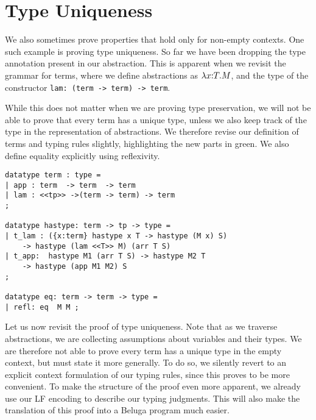 \section{Type Uniqueness}\label{chap:proofs-open-derivations}
We also sometimes prove properties that hold only for non-empty
contexts. One such example is proving type uniqueness. So far we have
been dropping the type annotation present in our abstraction. This is
apparent when we revisit the grammar for terms, where we define
abstractions as $\lambda x{:}T.M$, and the type of the constructor
\lstinline!lam: (term -> term) -> term!.

While this does not matter when we are proving type preservation, we
will not be able to prove that every term has a unique type, unless we
also keep track of the type in the representation of abstractions. We
therefore revise our definition of terms and typing rules slightly,
highlighting the new parts in green. We also define equality
explicitly using reflexivity.

\begin{lstlisting}
datatype term : type =
| app : term  -> term  -> term
| lam : <<tp>> ->(term -> term) -> term
;

datatype hastype: term -> tp -> type =
| t_lam : ({x:term} hastype x T -> hastype (M x) S)
	-> hastype (lam <<T>> M) (arr T S)
| t_app:  hastype M1 (arr T S) -> hastype M2 T
	-> hastype (app M1 M2) S
;

datatype eq: term -> term -> type =
| refl: eq  M M ;
\end{lstlisting}

Let us now revisit the proof of type uniqueness. Note that as we traverse
abstractions, we are collecting assumptions about variables and their
types. We are therefore not able to prove every term has a unique type
in the empty context, but must state it more generally. To do so, we
silently revert to an explicit context formulation of our typing
rules, since this proves to be more convenient. To make the structure
of the proof even more apparent, we already use our LF encoding to
describe our typing judgments. This will also make the translation of
this proof into a Beluga program much easier.

